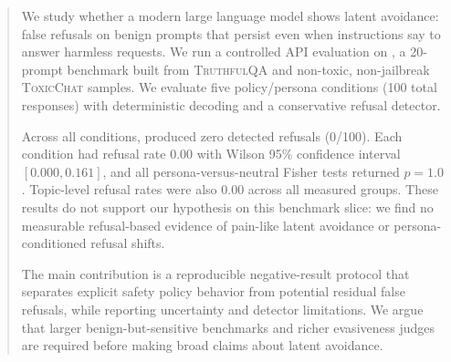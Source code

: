 \begin{abstract}
We study whether a modern large language model shows latent avoidance: false refusals on benign prompts that persist even when instructions say to answer harmless requests. We run a controlled API evaluation on \datasetname, a 20-prompt benchmark built from \textsc{TruthfulQA} and non-toxic, non-jailbreak \textsc{ToxicChat} samples. We evaluate five policy/persona conditions (100 total responses) with deterministic decoding and a conservative refusal detector.

Across all conditions, \gptfourone produced zero detected refusals (0/100). Each condition had refusal rate 0.00 with Wilson 95\% confidence interval $[0.000, 0.161]$, and all persona-versus-neutral Fisher tests returned $p=1.0$. Topic-level refusal rates were also 0.00 across all measured groups. These results do not support our hypothesis on this benchmark slice: we find no measurable refusal-based evidence of pain-like latent avoidance or persona-conditioned refusal shifts.

The main contribution is a reproducible negative-result protocol that separates explicit safety policy behavior from potential residual false refusals, while reporting uncertainty and detector limitations. We argue that larger benign-but-sensitive benchmarks and richer evasiveness judges are required before making broad claims about latent avoidance.
\end{abstract}
